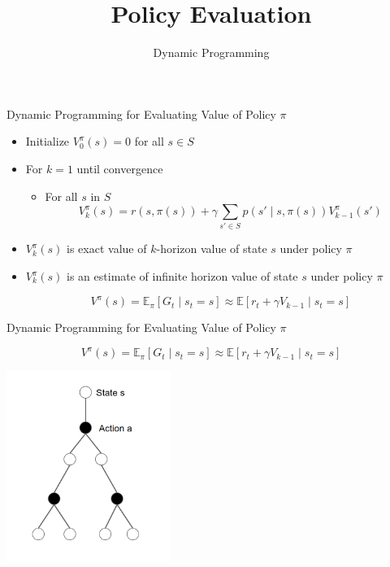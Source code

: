 \documentclass[aspectratio=169]{../latex_main/tntbeamer}  %
\title[Reinforcement Learning: Policy Evaluation]{Policy Evaluation}
\subtitle{Dynamic Programming}
\begin{document}
	
	\maketitle

\begin{frame}[c]{Dynamic Programming for Evaluating Value of Policy $\pi$}

\begin{itemize}
	\item Initialize $V^\pi_0(s) = 0$ for all $s\in S$
	\item For $k=1$ until convergence
	\begin{itemize}
		\item For all $s$ in $S$
		$$V^\pi_k (s)  = r(s, \pi(s)) + \gamma \sum_{s' \in S} p(s' \mid s, \pi(s)) V^\pi_{k-1} (s') $$
	\end{itemize}
	\item $V^\pi_k (s)$ is exact value of $k$-horizon value of state $s$ under policy $\pi$
	\item $V^\pi_k (s)$ is an estimate of infinite horizon value of state $s$ under policy $\pi$
	
	$$V^\pi (s) = \mathbb{E}_\pi [G_t \mid s_t = s] \approx \mathbb{E} [r_t + \gamma V_{k-1} \mid s_t = s]$$
\end{itemize}



\end{frame}
\begin{frame}[c]{Dynamic Programming for Evaluating Value of Policy $\pi$}

$$V^\pi (s) = \mathbb{E}_\pi [G_t \mid s_t = s] \approx \mathbb{E} [r_t + \gamma V_{k-1} \mid s_t = s]$$

\begin{center}
	\includegraphics[width=0.4\textwidth]{images/state_action_graph.png}
\end{center}



\end{frame}
\end{document}

